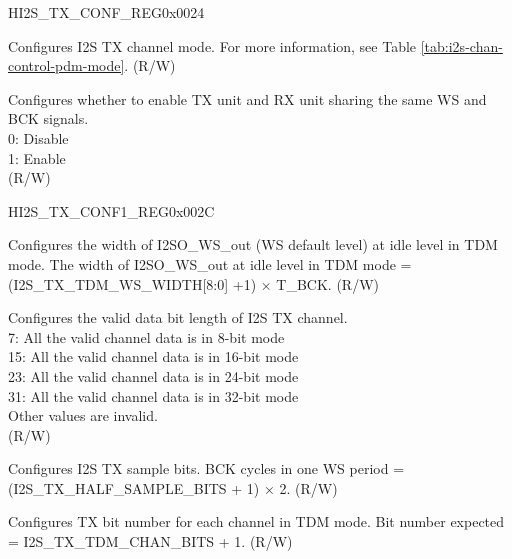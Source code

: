 \begin{register}{H}{I2S\_TX\_CONF\_REG}{0x0024}
\begin{regdesc}
\begin{reglist}
\label{fielddesc:I2STXCHANMOD}\item [I2S\_TX\_CHAN\_MOD] Configures I2S TX channel mode. For more information, see Table \ref{tab:i2s-chan-control-pdm-mode}. (R/W)
\label{fielddesc:I2SSIGLOOPBACK}\item [I2S\_SIG\_LOOPBACK] Configures whether to enable TX unit and RX unit sharing the same WS and BCK signals. \\
0: Disable\\
1: Enable\\
(R/W)
\end{reglist}\end{regdesc}
\end{register}


\begin{register}{H}{I2S\_TX\_CONF1\_REG}{0x002C}\label{regdesc:I2STXCONF1REG}
%
%
%
%
%
\regnewline%
\begin{regdesc}\begin{reglist}
\label{fielddesc:I2STXTDMWSWIDTH}\item [I2S\_TX\_TDM\_WS\_WIDTH] Configures the width of I2SO\_WS\_out (WS default level) at idle level in TDM mode. The width of I2SO\_WS\_out at idle level in TDM mode = (I2S\_TX\_TDM\_WS\_WIDTH[8:0] +1) × T\_BCK. (R/W)
\label{fielddesc:I2STXBITSMOD}\item [I2S\_TX\_BITS\_MOD] Configures the valid data bit length of I2S TX channel. \\
7: All the valid channel data is in 8-bit mode\\
15: All the valid channel data is in 16-bit mode\\
23: All the valid channel data is in 24-bit mode\\
31: All the valid channel data is in 32-bit mode\\
Other values are invalid.\\
(R/W)
\label{fielddesc:I2STXHALFSAMPLEBITS}\item [I2S\_TX\_HALF\_SAMPLE\_BITS] Configures I2S TX sample bits. BCK cycles in one WS period = (I2S\_TX\_HALF\_SAMPLE\_BITS + 1) × 2. (R/W)
\label{fielddesc:I2STXTDMCHANBITS}\item [I2S\_TX\_TDM\_CHAN\_BITS] Configures TX bit number for each channel in TDM mode. Bit number expected = I2S\_TX\_TDM\_CHAN\_BITS + 1. (R/W)
\end{reglist}\end{regdesc}
\end{register}


